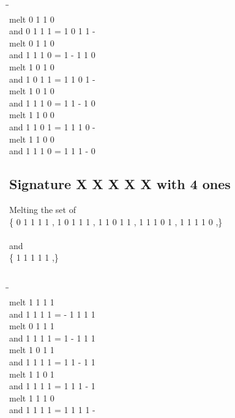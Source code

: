 \documentclass{article}
\begin{document}
\newpage
\begin{tabbing}
\hspace{3cm}\=\hspace{3cm}\=\hspace{3cm}\\[1cm]
melt  0  1  1  0 \\
and  0  1  1  1 \>
 =  1  0  1  1  - \\[1mm]
melt  0  1  1  0 \\
and  1  1  1  0 \>
 =  1  -  1  1  0 \\[1mm]
melt  1  0  1  0 \\
and  1  0  1  1 \>
 =  1  1  0  1  - \\[1mm]
melt  1  0  1  0 \\
and  1  1  1  0 \>
 =  1  1  -  1  0 \\[1mm]
melt  1  1  0  0 \\
and  1  1  0  1 \>
 =  1  1  1  0  - \\[1mm]
melt  1  1  0  0 \\
and  1  1  1  0 \>
 =  1  1  1  -  0 \\[1mm]
\end{tabbing}
\newpage
\subsection{Signature X X X X X with 4 ones}
Melting the set of\\
\{ 0  1  1  1  1 , 1  0  1  1  1 , 1  1  0  1  1 , 1  1  1  0  1 , 1  1  1  1  0 ,\}\\\\
and\\
\{ 1  1  1  1  1 ,\}\\\\
\begin{tabbing}
\hspace{3cm}\=\hspace{3cm}\=\hspace{3cm}\\[1cm]
melt  1  1  1  1 \\
and  1  1  1  1 \>
 =  -  1  1  1  1 \\[1mm]
melt  0  1  1  1 \\
and  1  1  1  1 \>
 =  1  -  1  1  1 \\[1mm]
melt  1  0  1  1 \\
and  1  1  1  1 \>
 =  1  1  -  1  1 \\[1mm]
melt  1  1  0  1 \\
and  1  1  1  1 \>
 =  1  1  1  -  1 \\[1mm]
melt  1  1  1  0 \\
and  1  1  1  1 \>
 =  1  1  1  1  - \\[1mm]
\end{tabbing}
\newpage
\end{document}
